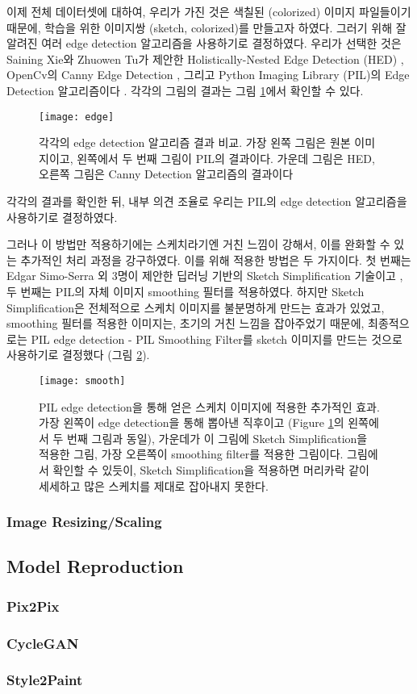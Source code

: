 이제 전체 데이터셋에 대하여, 우리가 가진 것은 색칠된 (colorized) 이미지 파일들이기 때문에, 학습을 위한 이미지쌍 (sketch, colorized)를 만들고자 하였다. 그러기 위해 잘 알려진 여러 edge detection 알고리즘을 사용하기로 결정하였다.
우리가 선택한 것은 Saining Xie와 Zhuowen Tu가 제안한 Holistically-Nested Edge Detection (HED) \cite{Saining2015}, OpenCv의 Canny Edge Detection \cite{opencv}, 그리고 Python Imaging Library (PIL)의 Edge Detection 알고리즘이다 \cite{pillow}. 각각의 그림의 결과는 그림 \ref{fig:edge_detection}에서 확인할 수 있다.
\begin{figure}[t]
	\centering
	\texttt{[image: edge]}
	\caption{각각의 edge detection 알고리즘 결과 비교. 가장 왼쪽 그림은 원본 이미지이고, 왼쪽에서 두 번째 그림이 PIL의 결과이다. 가운데 그림은 HED, 오른쪽 그림은 Canny Detection 알고리즘의 결과이다}
	\label{fig:edge_detection}
\end{figure}
각각의 결과를 확인한 뒤, 내부 의견 조율로 우리는 PIL의 edge detection 알고리즘을 사용하기로 결정하였다. 

그러나 이 방법만 적용하기에는 스케치라기엔 거친 느낌이 강해서, 이를 완화할 수 있는 추가적인 처리 과정을 강구하였다.
이를 위해 적용한 방법은 두 가지이다.
첫 번째는 Edgar Simo-Serra 외 3명이 제안한 딥러닝 기반의 Sketch Simplification 기술이고 \cite{SimoSerraTOG2018}, 두 번째는 PIL의 자체 이미지 smoothing 필터를 적용하였다.
하지만 Sketch Simplification은 전체적으로 스케치 이미지를 불분명하게 만드는 효과가 있었고, smoothing 필터를 적용한 이미지는, 초기의 거친 느낌을 잡아주었기 때문에, 최종적으로는 PIL edge detection - PIL Smoothing Filter를 sketch 이미지를 만드는 것으로 사용하기로 결정했다 (그림 \ref{fig:edge_smooth}).
\begin{figure}[t]
	\centering
	\texttt{[image: smooth]}
	\caption{PIL edge detection을 통해 얻은 스케치 이미지에 적용한 추가적인 효과. 가장 왼쪽이 edge detection을 통해 뽑아낸 직후이고 (Figure \ref{fig:edge_detection}의 왼쪽에서 두 번째 그림과 동일), 가운데가 이 그림에 Sketch Simplification을 적용한 그림, 가장 오른쪽이 smoothing filter를 적용한 그림이다. 그림에서 확인할 수 있듯이, Sketch Simplification을 적용하면 머리카락 같이 세세하고 많은 스케치를 제대로 잡아내지 못한다.}
	\label{fig:edge_smooth}
\end{figure}

\subsubsection{Image Resizing/Scaling}


\subsection{Model Reproduction}

\subsubsection{Pix2Pix}

\subsubsection{CycleGAN}

\subsubsection{Style2Paint}